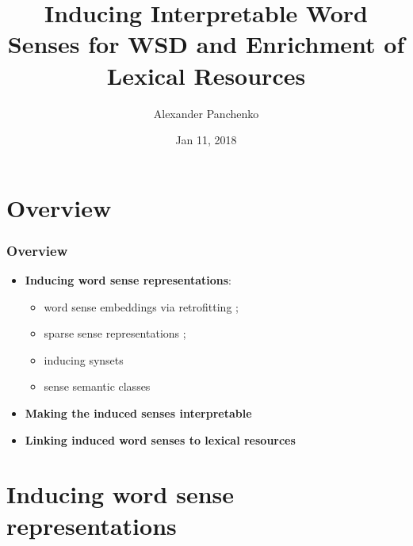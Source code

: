 \documentclass{beamer}
\title{Inducing Interpretable Word Senses for WSD and Enrichment of Lexical Resources}
\author{Alexander Panchenko} %
\date[11.02.2018]{Jan 11, 2018}
\begin{document}
\maketitle


\section{Overview}

\begin{frame}
  \frametitle{Overview}

  \begin{itemize}
		\item \textbf{Inducing word sense representations}:
		\begin{itemize}
		\item word sense embeddings via retrofitting \cite{pelevina-EtAl:2016:RepL4NLP,remus:2018};
		\item sparse sense representations \cite{panchenko-EtAl:2017:EACLlong};
		\item inducing synsets~\cite{ustalov-panchenko-biemann:2017:Long}
		\item sense semantic classes \cite{panchenko:2018:SemanticClasses} 
		\end{itemize}
		
	\pause 
	\vspace{1em}
	\item \textbf{Making the induced senses interpretable} \cite{panchenko-EtAl:2017:EMNLP2017Demos,panchenko-EtAl:2017:EACLlong}
	
	\pause
	\vspace{1em}
	\item \textbf{Linking induced word senses to lexical resources}~\cite{faralli2016linked,panchenko-EtAl:2017:SENSE2017,biemann2018framework}	
			
\end{itemize}
	
\end{frame}

\section{Inducing word sense representations}
\end{document}
